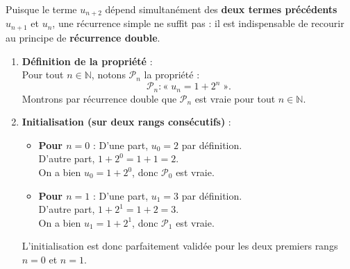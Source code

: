 \documentclass[11pt,a4paper]{article}
\newcommand{\N}{\mathbb{N}}
\begin{document}
\begin{correctionbox}
Puisque le terme $u_{n+2}$ dépend simultanément des \textbf{deux termes précédents} $u_{n+1}$ et $u_n$, une récurrence simple ne suffit pas : il est indispensable de recourir au principe de \textbf{récurrence double}.

\begin{enumerate}[label=\textbf{\arabic*.}]
    \item \textbf{Définition de la propriété} :\\
    Pour tout $n \in \N$, notons $\mathcal{P}_n$ la propriété :
    \[
    \mathcal{P}_n : « \; u_n = 1 + 2^n \; ».
    \]
    Montrons par récurrence double que $\mathcal{P}_n$ est vraie pour tout $n \in \N$.

    \item \textbf{Initialisation (sur deux rangs consécutifs)} :
    \begin{itemize}
        \item \textbf{Pour $n = 0$} :
        D'une part, $u_0 = 2$ par définition.\\
        D'autre part, $1 + 2^0 = 1 + 1 = 2$.\\
        On a bien $u_0 = 1 + 2^0$, donc $\mathcal{P}_0$ est vraie.
        \item \textbf{Pour $n = 1$} :
        D'une part, $u_1 = 3$ par définition.\\
        D'autre part, $1 + 2^1 = 1 + 2 = 3$.\\
        On a bien $u_1 = 1 + 2^1$, donc $\mathcal{P}_1$ est vraie.
    \end{itemize}
    L'initialisation est donc parfaitement validée pour les deux premiers rangs $n = 0$ et $n = 1$.


\end{enumerate}
\end{correctionbox}
\end{document}
